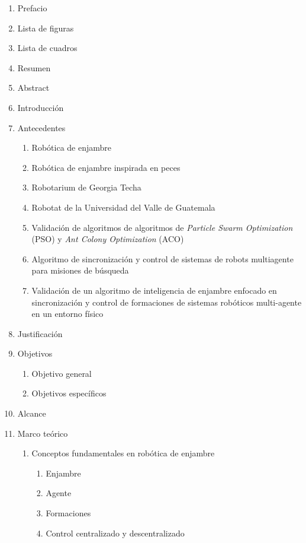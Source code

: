 \renewcommand{\labelenumii}{\arabic{enumi}.\arabic{enumii}}
\renewcommand{\labelenumiii}{\arabic{enumi}.\arabic{enumii}.\arabic{enumiii}}
\begin{enumerate}
	\item[] Prefacio
	\item[] Lista de figuras
	\item[] Lista de cuadros
	\item[] Resumen
	\item[] Abstract
	\item Introducción
	\item Antecedentes
	\begin{enumerate}
		\item Robótica de enjambre
		\item Robótica de enjambre inspirada en peces
		\item Robotarium de Georgia Techa
		\item Robotat de la Universidad del Valle de Guatemala
		\item Validación de algoritmos de algoritmos de \textit{Particle Swarm Optimization} (PSO) y \textit{Ant Colony Optimization} (ACO)
		\item Algoritmo de sincronización y control de sistemas de robots multiagente para misiones de búsqueda
		\item Validación de un algoritmo de inteligencia de enjambre enfocado en sincronización y control de formaciones de sistemas robóticos multi-agente en un entorno físico
	\end{enumerate}	
	\item Justificación
	\item Objetivos
	\begin{enumerate}
		\item Objetivo general
		\item Objetivos específicos
	\end{enumerate}
	\item Alcance
	\item Marco teórico
	\begin{enumerate}
		\item Conceptos fundamentales en robótica de enjambre
		\begin{enumerate}
			\item Enjambre
			\item Agente
			\item Formaciones
			\item Control centralizado y descentralizado
		\end{enumerate}

\end{enumerate}
\end{enumerate}
